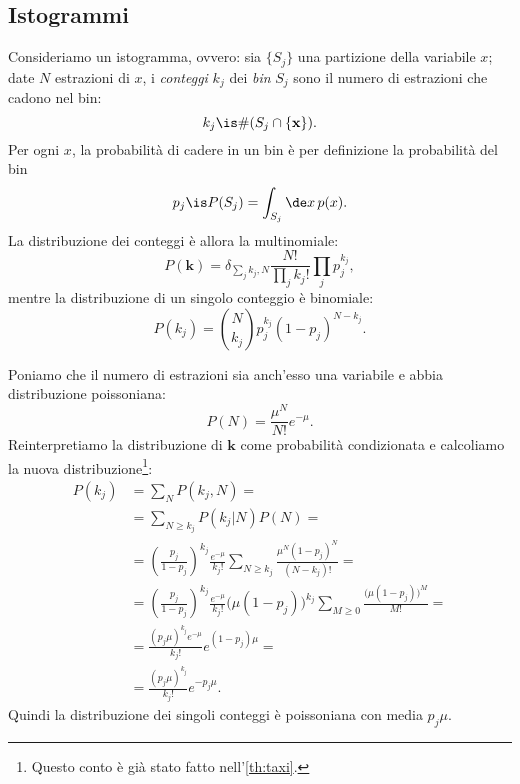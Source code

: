 
\subsection{Istogrammi}
\label{sec:hist}

Consideriamo un istogramma, ovvero:
sia $\{S_j\}$ una partizione della variabile $x$;
date $N$ estrazioni di $x$, i \emph{conteggi} $k_j$ dei \emph{bin} $S_j$
sono il numero di estrazioni che cadono nel bin:
\begin{equation*}
	k_j \is \# (S_j \cap \{\mathbf x\}).
\end{equation*}
Per ogni $x$, la probabilità di cadere in un bin è per definizione la probabilità del bin
\begin{equation*}
	p_j \is P(S_j) = \int_{S_j} \de x\,p(x).
\end{equation*}
La distribuzione dei conteggi è allora la multinomiale:
\begin{equation*}
	P(\mathbf k)
	= \delta_{\sum_jk_j,N} \frac{N!}{\prod_jk_j!}\prod_j p_j^{k_j},
\end{equation*}
mentre la distribuzione di un singolo conteggio è binomiale:
\begin{equation*}
	P(k_j) = \binom N{k_j} p_j^{k_j} (1-p_j)^{N-k_j}.
\end{equation*}

Poniamo che il numero di estrazioni sia anch'esso una variabile e abbia distribuzione poissoniana:
\begin{equation*}
	P(N)
	= \frac{\mu^N}{N!}e^{-\mu}.
\end{equation*}
Reinterpretiamo la distribuzione di $\mathbf k$ come probabilità condizionata e calcoliamo la nuova distribuzione\footnote{Questo conto è già stato fatto nell'\autoref{th:taxi}.}:
\begin{align*}
	P(k_j)
	&= \sum_N P(k_j,N) = \\
	&= \sum_{N\ge k_j} P(k_j|N) P(N) = \\
	&= \left(\frac{p_j}{1-p_j}\right)^{k_j} \frac{e^{-\mu}}{k_j!}
	\sum_{N\ge k_j} \frac{\mu^N (1-p_j)^N}{(N-k_j)!} = \\
	&= \left(\frac{p_j}{1-p_j}\right)^{k_j} \frac{e^{-\mu}}{k_j!}
	\big(\mu(1-p_j)\big)^{k_j} \sum_{M\ge 0} \frac{\big(\mu(1-p_j)\big)^M}{M!} = \\
	&= \frac{(p_j\mu)^{k_j} e^{-\mu}}{k_j!} e^{(1-p_j)\mu} = \\
	&= \frac{(p_j\mu)^{k_j}}{k_j!} e^{-p_j\mu}.
\end{align*}
Quindi la distribuzione dei singoli conteggi è poissoniana con media $p_j\mu$.

